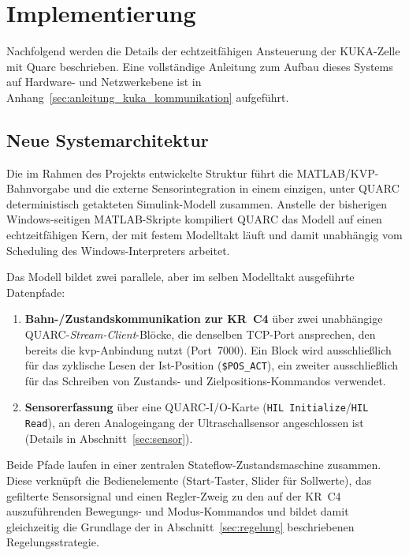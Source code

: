 \section{Implementierung}
\label{sec:implementierung}

Nachfolgend werden die Details der echtzeitfähigen Ansteuerung der KUKA-Zelle mit Quarc beschrieben.
Eine vollständige Anleitung zum Aufbau dieses Systems auf Hardware- und Netzwerkebene ist in Anhang~\ref{sec:anleitung_kuka_kommunikation} aufgeführt.

\subsection{Neue Systemarchitektur}
\label{sec:neue-systemarchitektur}

Die im Rahmen des Projekts entwickelte Struktur führt die MATLAB/KVP-Bahnvorgabe \cite{friesen2021} und die externe Sensorintegration \cite{huebel2022} in einem einzigen, unter QUARC deterministisch getakteten Simulink-Modell zusammen.
Anstelle der bisherigen Windows-seitigen MATLAB-Skripte kompiliert QUARC das Modell auf einen echtzeitfähigen Kern, der mit festem Modelltakt läuft und damit unabhängig vom Scheduling des Windows-Interpreters arbeitet.

Das Modell bildet zwei parallele, aber im selben Modelltakt ausgeführte
Datenpfade:

\begin{enumerate}
    \item \textbf{Bahn-/Zustandskommunikation zur KR~C4} über zwei
    unabhängige QUARC-\emph{Stream-Client}-Blöcke, die denselben TCP-Port
    ansprechen, den bereits die \ac{kvp}-Anbindung nutzt (Port~7000).
    Ein Block wird ausschließlich für das zyklische Lesen der Ist-Position
    (\texttt{\$POS\_ACT}), ein zweiter ausschließlich für das Schreiben von Zustands- und Zielpositions-Kommandos verwendet.
    \item \textbf{Sensorerfassung} über eine QUARC-I/O-Karte
    (\texttt{HIL Initialize}/\texttt{HIL Read}), an deren Analogeingang der
    Ultraschallsensor angeschlossen ist (Details in
    Abschnitt~\ref{sec:sensor}).
\end{enumerate}

Beide Pfade laufen in einer zentralen Stateflow-Zustandsmaschine zusammen.
Diese verknüpft die Bedienelemente (Start-Taster,
Slider für Sollwerte), das gefilterte Sensorsignal und einen
Regler-Zweig zu den auf der KR~C4 auszuführenden Bewegungs- und Modus-Kommandos und bildet damit
gleichzeitig die Grundlage der in Abschnitt~\ref{sec:regelung}
beschriebenen Regelungsstrategie.

